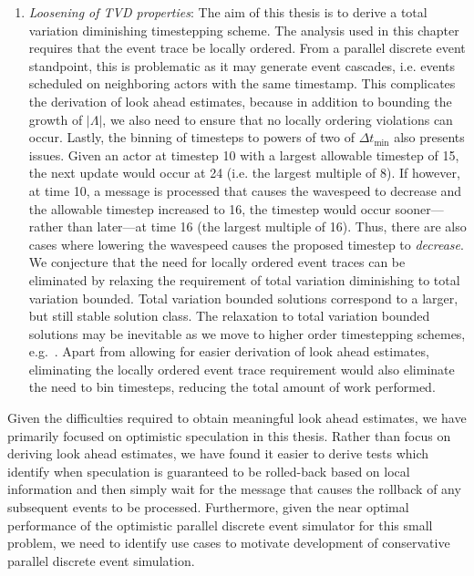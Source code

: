 {\begin{enumerate}
\item {\em Loosening of TVD properties}: The aim of this thesis is to derive a total variation diminishing timestepping scheme. The analysis used in this chapter requires that the event trace be locally ordered. From a parallel discrete event standpoint, this is problematic as it may generate event cascades, i.e. events scheduled on neighboring actors with the same timestamp. This complicates the derivation of look ahead estimates, because in addition to bounding the growth of $|\Lambda|$, we also need to ensure that no locally ordering violations can occur. Lastly, the binning of timesteps to powers of two of $\Delta t_{\min}$ also presents issues. Given an actor at timestep 10 with a largest allowable timestep of 15, the next update would occur at 24 (i.e. the largest multiple of 8). If however, at time 10, a message is processed that causes the wavespeed to decrease and the allowable timestep increased to 16, the timestep would occur sooner---rather than later---at time 16 (the largest multiple of 16). Thus, there are also cases where lowering the wavespeed causes the proposed timestep to {\em decrease}. We conjecture that the need for locally ordered event traces can be eliminated by relaxing the requirement of total variation diminishing to total variation bounded. Total variation bounded solutions correspond to a larger, but still stable solution class. The relaxation to total variation bounded solutions may be inevitable as we move to higher order timestepping schemes, e.g.~\cite{Constantinescu2007}. Apart from allowing for easier derivation of look ahead estimates, eliminating the locally ordered event trace requirement would also eliminate the need to bin timesteps, reducing the total amount of work  performed.
\end{enumerate}

Given the difficulties required to obtain meaningful look ahead estimates, we have primarily focused on optimistic speculation in this thesis. Rather than focus on deriving look ahead estimates, we have found it easier to derive tests which identify when speculation is guaranteed to be rolled-back based on local information and then simply wait for the message that causes the rollback of any subsequent events to be processed. Furthermore, given the near optimal performance of the optimistic parallel discrete event simulator for this small problem, we need to identify use cases to motivate development of conservative parallel discrete event simulation.}
